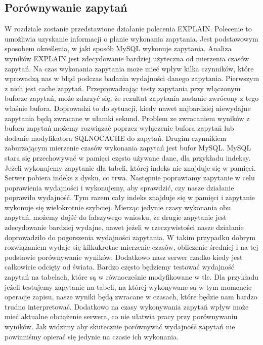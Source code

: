 \subsection{Porównywanie zapytań}
W rozdziale zostanie przedstawione działanie polecenia EXPLAIN. Polecenie to umożliwia uzyskanie informacji o planie wykonania zapytania. Jest podstawowym sposobem określenia, w jaki sposób MySQL wykonuje zapytania. Analiza wyników EXPLAIN jest zdecydowanie bardziej użyteczna od mierzenia czasów zapytań. Na czas wykonania zapytania może mieć wpływ kilka czynników, które wprowadzą nas w błąd podczas badania wydajności danego zapytania. Pierwszym z nich jest cache zapytań. Przeprowadzając testy zapytania przy włączonym buforze zapytań, może zdarzyć się, że rezultat zapytania zostanie zwrócony z tego właśnie bufora. Doprowadzi to do sytuacji, kiedy nawet najbardziej niewydajne zapytania będą zwracane w ułamki sekund.  Problem ze zwracaniem wyników z bufora zapytań możemy rozwiązać poprzez wyłączenie bufora zapytań lub dodanie modyfikatora SQL\textunderscore NO\textunderscore CACHE do zapytań. Drugim czynnikiem zaburzającym mierzenie czasów wykonania zapytań jest bufor MySQL. MySQL stara się przechowywać w pamięci często używane dane, dla przykładu indeksy. Jeżeli wykonujemy zapytanie dla tabeli, której indeks nie znajduje się w pamięci. Serwer pobiera indeks z dysku, co trwa. Następnie poprawiamy zapytanie w celu poprawienia wydajności i wykonujemy, aby sprawdzić, czy nasze działanie poprawiło wydajność. Tym razem cały indeks znajduje się w pamięci i zapytanie wykonuje się wielokrotnie szybciej. Mierząc jedynie czasy wykonania obu zapytań, możemy dojść do fałszywego wniosku, że drugie zapytanie jest zdecydowanie bardziej wydajne, nawet jeżeli w rzeczywistości nasze działanie doprowadziło do pogorszenia wydajności zapytania. W takim przypadku dobrym rozwiązaniem wydaje się kilkukrotne mierzenie czasów, obliczenie średniej i na tej podstawie porównywanie wyników. Dodatkowo nasz serwer rzadko kiedy jest całkowicie odcięty od świata. Bardzo często będziemy testować wydajność zapytań na tabelach, które są w równocześnie modyfikowane w tle. Dla przykładu jeżeli testujemy zapytanie na tabeli, na której wykonywane są w tym momencie operacje zapisu, nasze wyniki będą zwracane w czasach, które będzie nam bardzo trudno interpretować. Dodatkowo na czasy wykonywania zapytań wpływ może mieć aktualne obciążenie serwera, co nie ułatwia pracy przy porównywaniu wyników. Jak widzimy aby skutecznie porównywać wydajność zapytań nie powinniśmy opierać się jedynie na czasie ich wykonania.
